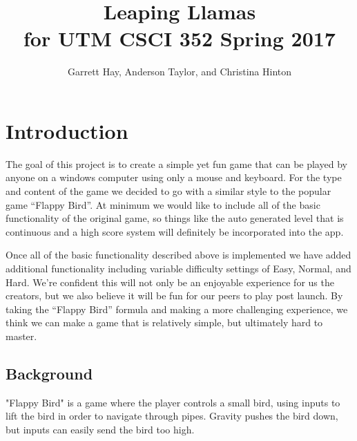 \documentclass[10pt,conference,onecolumn,compsoc]{IEEEtran}
\begin{document}
\title{Leaping Llamas\\ for UTM CSCI 352 Spring 2017}

\author{Garrett Hay, Anderson Taylor, and Christina Hinton \\ %
}

\maketitle

\IEEEdisplaynontitleabstractindextext
\IEEEpeerreviewmaketitle

\section{Introduction}
	The goal of this project is to create a simple yet fun game that can be played by anyone on a windows computer using only a mouse and keyboard.  For the type and content of the game we decided to go with a similar style to the popular game “Flappy Bird”.  At minimum we would like to include all of the basic functionality of the original game, so things like the auto generated level that is continuous and a high score system will definitely be incorporated into the app.
	
	Once all of the basic functionality described above is implemented we have added additional functionality including variable difficulty settings of Easy, Normal, and Hard. We’re confident this will not only be an enjoyable experience for us the creators, but we also believe it will be fun for our peers to play post launch. By taking the “Flappy Bird” formula and making a more challenging experience, we think we can make a game that is relatively simple, but ultimately hard to master. 

\subsection{Background}
	"Flappy Bird" is a game where the player controls a small bird, using inputs to lift the bird in order to navigate through pipes. Gravity pushes the bird down, but inputs can easily send the bird too high.
\end{document}
